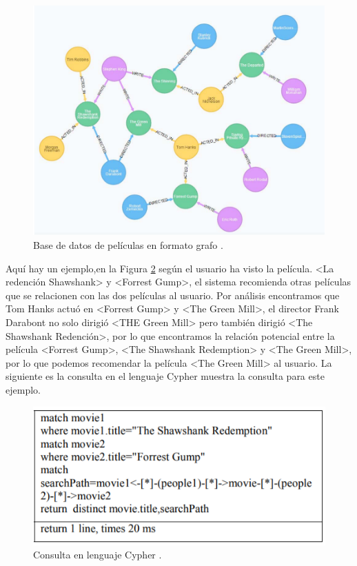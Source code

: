 \begin{figure}[H]
    \centering
    \includegraphics[scale=0.5]{Graficos/bd.png}
    \caption{Base de datos de películas en formato grafo \cite{lu2017analysis}.}
    \label{fig:grafo_bd}
\end{figure}
\newpage
Aquí hay un ejemplo,en la Figura \ref{fig:consulta} según el usuario ha visto la película.
<La redención Shawshank> y <Forrest Gump>, el sistema recomienda otras películas que se relacionen con las dos películas al usuario.
Por análisis encontramos que Tom Hanks actuó en <Forrest Gump>
y <The Green Mill>, el director Frank Darabont no solo
dirigió <THE Green Mill> pero también dirigió <The Shawshank
Redención>, por lo que encontramos la relación potencial entre la
película <Forrest Gump>, <The Shawshank Redemption> y
<The Green Mill>, por lo que podemos recomendar la película <The
Green Mill> al usuario. La siguiente es la consulta en el lenguaje Cypher muestra la consulta para este ejemplo.
\begin{figure}[H]
    \centering
    \includegraphics[scale=0.8]{Graficos/cypher1.png}
    \caption{Consulta en lenguaje Cypher \cite{lu2017analysis}.}
    \label{fig:consulta}
\end{figure}

